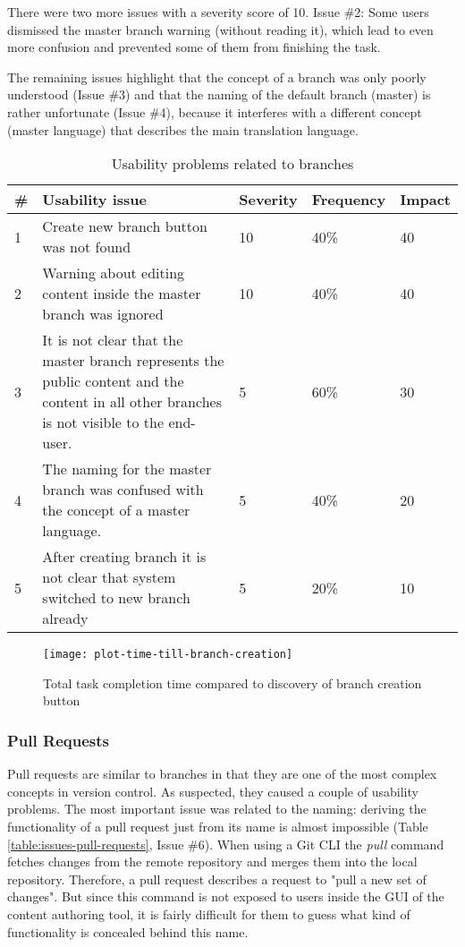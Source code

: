 There were two more issues with a severity score of 10. Issue \#2: Some users dismissed the master branch warning (without reading it), which lead to even more confusion and prevented some of them from finishing the task.

The remaining issues highlight that the concept of a branch was only poorly understood (Issue \#3) and that the naming of the default branch (master) is rather unfortunate (Issue \#4), because it interferes with a different concept (master language) that describes the main translation language.

\begin{table}[h!]
\centering
\begin{tabular}{|l|p{7cm}|l|l|l|}
\hline
\rowcolor[HTML]{EFEFEF}
\textbf{\#} & \textbf{Usability issue} & \textbf{Severity} & \textbf{Frequency} & \textbf{Impact} \\ \hline
1 & Create new branch button was not found & 10 & 40\% & 40 \\ \hline
2 & Warning about editing content inside the master branch was ignored & 10 & 40\% & 40 \\ \hline
3 & It is not clear that the master branch represents the public content and the content in all other branches is not visible to the end-user. & 5 & 60\% & 30 \\ \hline
4 & The naming for the master branch was confused with the concept of a master language. & 5 & 40\% & 20 \\ \hline
5 & After creating branch it is not clear that system switched to new branch already & 5 & 20\% & 10 \\ \hline
\end{tabular}
\caption{Usability problems related to branches}
\label{table:issues-branches}
\end{table}

\begin{figure}[h!]
 \centering
 \texttt{[image: plot-time-till-branch-creation]}
 \caption{Total task completion time compared to discovery of branch creation button}
 \label{fig:branch-creation-time}
\end{figure}

\subsubsection{Pull Requests}
Pull requests are similar to branches in that they are one of the most complex concepts in version control. As suspected, they caused a couple of usability problems. The most important issue was related to the naming: deriving the functionality of a pull request just from its name is almost impossible (Table \ref{table:issues-pull-requests}, Issue \#6). When using a Git CLI the \emph{pull} command fetches changes from the remote repository and merges them into the local repository. Therefore, a pull request describes a request to "pull a new set of changes". But since this command is not exposed to users inside the GUI of the content authoring tool, it is fairly difficult for them to guess what kind of functionality is concealed behind this name.

